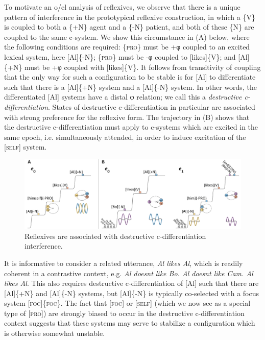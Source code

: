   To motivate an o/el analysis of reflexives, we observe that there is a unique pattern of interference in the prototypical reflexive construction, in which a \{V\} is coupled to both a \{+N\} agent and a \{-N\} patient, and both of these \{N\} are coupled to the same c-system. We show this circumstance in (A) below, where the following conditions are required: \{\textsc{pro}\} must be +φ coupled to an excited lexical system, here [Al]\{-N\}; \{\textsc{pro}\} must be -φ coupled to [likes]\{V\}; and [Al]\{+N\} must be +φ coupled with [likes]\{V\}. It follows from transitivity of coupling that the only way for such a configuration to be stable is for [Al] to differentiate such that there is a [Al]\{+N\} system and a [Al]\{-N\} system. In other words, the differentiated [Al] systems have a distal φ relation; we call this a \textit{destructive c-differentiation}. States of destructive c-differentiation in particular are associated with strong preference for the reflexive form. The trajectory in (B) shows that the destructive c-differentiation must apply to c-systems which are excited in the same epoch, i.e. simultaneously attended, in order to induce excitation of the [\textsc{self}] system. 

\ea
{}  
\z
\z
  
\begin{figure}
\includegraphics[width=\textwidth]{figures/Tilsen-img156.png}
\caption{Reflexives are associated with destructive c-differentiation interference.}
\label{fig:7:12}
\end{figure}
 

  It is informative to consider a related utterance, \textit{Al likes Al}, which is readily coherent in a contrastive context, e.g. \textit{Al doesnt like Bo. Al doesnt like Cam. Al likes Al}. This also requires destructive c-differentiation of [Al] such that there are [Al]\{+N\} and [Al]\{-N\} systems, but [Al]\{-N\} is typically co-selected with a focus system [\textsc{foc}]\{\textsc{foc}\}. The fact that [\textsc{foc}] or [\textsc{self}] (which we now see as a special type of [\textsc{pro}]) are strongly biased to occur in the destructive c-differentiation context suggests that these systems may serve to stabilize a configuration which is otherwise somewhat unstable.

